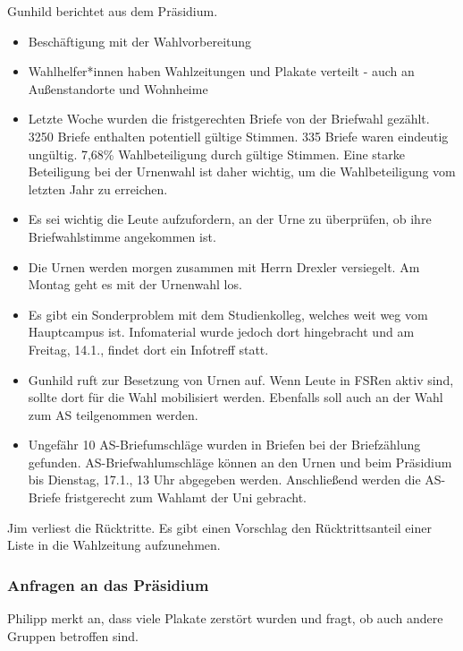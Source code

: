 \documentclass[ngerman,headheight=70pt]{scrartcl}
\begin{document}
    Gunhild berichtet aus dem Präsidium.

    \begin{itemize}
        \item Beschäftigung mit der Wahlvorbereitung
        \item Wahlhelfer*innen haben Wahlzeitungen und Plakate verteilt - auch
              an Außenstandorte und Wohnheime
        \item Letzte Woche wurden die fristgerechten Briefe von der Briefwahl
              gezählt. 3250 Briefe enthalten potentiell gültige Stimmen. 335 Briefe
              waren eindeutig ungültig. 7,68\% Wahlbeteiligung durch gültige
              Stimmen. Eine starke Beteiligung bei der Urnenwahl ist daher
              wichtig, um die Wahlbeteiligung vom letzten Jahr zu erreichen.
        \item Es sei wichtig die Leute aufzufordern, an der Urne zu überprüfen, ob
              ihre Briefwahlstimme angekommen ist.
        \item Die Urnen werden morgen zusammen mit Herrn Drexler versiegelt. Am
              Montag geht es mit der Urnenwahl los.
        \item Es gibt ein Sonderproblem mit dem Studienkolleg, welches weit weg
              vom Hauptcampus ist. Infomaterial wurde jedoch dort hingebracht
              und am Freitag, 14.1., findet dort ein Infotreff statt.
        \item Gunhild ruft zur Besetzung von Urnen auf. Wenn Leute in FSRen aktiv
              sind, sollte dort für die Wahl mobilisiert werden. Ebenfalls soll
              auch an der Wahl zum AS teilgenommen werden.
        \item Ungefähr 10 AS-Briefumschläge wurden in Briefen bei der Briefzählung
              gefunden. AS-Briefwahlumschläge können an den Urnen und beim Präsidium
              bis Dienstag, 17.1., 13 Uhr abgegeben werden. Anschließend werden
              die AS-Briefe fristgerecht zum Wahlamt der Uni gebracht.
    \end{itemize}

    Jim verliest die Rücktritte. Es gibt einen Vorschlag den Rücktrittsanteil einer
    Liste in die Wahlzeitung aufzunehmen.

    \subsubsection{Anfragen an das Präsidium}

    Philipp merkt an, dass viele Plakate zerstört wurden und fragt, ob auch andere
    Gruppen betroffen sind.
\end{document}

